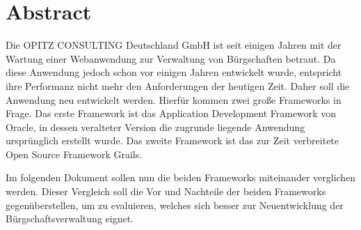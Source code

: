 \section*{Abstract}
Die OPITZ CONSULTING Deutschland GmbH ist seit einigen Jahren mit der Wartung einer Webanwendung zur Verwaltung von Bürgschaften betraut. Da diese Anwendung jedoch schon vor einigen Jahren entwickelt wurde, entspricht ihre Performanz nicht mehr den Anforderungen der heutigen Zeit. Daher soll die Anwendung neu entwickelt werden. Hierfür kommen zwei große Frameworks in Frage. Das erste Framework ist das Application Development Framework von Oracle, in dessen veralteter Version  die zugrunde liegende Anwendung ursprünglich erstellt wurde. Das zweite Framework ist das zur Zeit verbreitete Open Source Framework Grails.

Im folgenden Dokument sollen nun die beiden Frameworks miteinander verglichen werden. Dieser Vergleich soll die Vor und Nachteile der beiden Frameworks gegenüberstellen, um zu evaluieren, welches sich besser zur Neuentwicklung der Bürgschaftsverwaltung eignet.